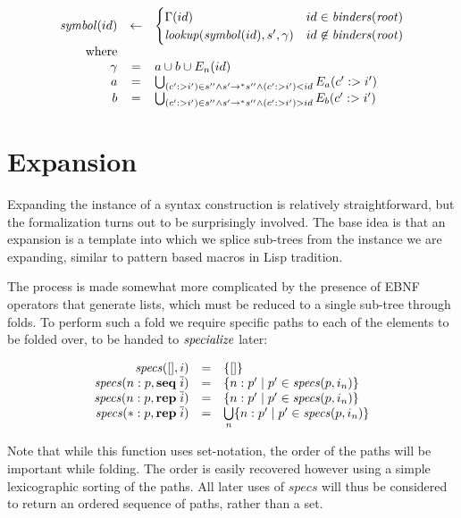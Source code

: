 \documentclass{kththesis}
\begin{document}
$$
\begin{array}{rcl}
\mathit{symbol}(id) & <- &
\begin{cases}
\Gamma(id) & id \in \mathit{binders}(\mathit{root}) \\
\mathit{lookup}(\mathit{symbol}(id), s', \gamma) & id \not\in \mathit{binders}(\mathit{root}) \\
\end{cases} \\
\text{where} & & \\
\gamma & = & a \cup b \cup E_n(id) \\
a & = & \bigcup_{(c' :> i') \in s'' \land s' ->* s'' \land (c' :> i') < id} E_a(c' :> i') \\
b & = & \bigcup_{(c' :> i') \in s'' \land s' ->* s'' \land (c' :> i') > id} E_b(c' :> i') \\
\end{array}
$$

\section{Expansion} \label{sec:expansion-formalization}

Expanding the instance of a syntax construction is relatively straightforward, but the formalization turns out to be surprisingly involved. The base idea is that an expansion is a template into which we splice sub-trees from the instance we are expanding, similar to pattern based macros in Lisp tradition.

The process is made somewhat more complicated by the presence of EBNF operators that generate lists, which must be reduced to a single sub-tree through folds. To perform such a fold we require specific paths to each of the elements to be folded over, to be handed to $\mathit{specialize}$ later:

\newcommand{\specs}{\ensuremath{\mathit{specs}}}

$$
\begin{array}{rcl}
\specs([], i) & = & \{[]\} \\
\specs(n:p, \seq \overline{i}) & = & \{n : p' \mid p' \in \specs(p, i_n)\} \\
\specs(n:p, \repseq \overline{i}) & = & \{n : p' \mid p' \in \specs(p, i_n)\} \\
\specs(*:p, \repseq \overline{i}) & = & \bigcup\limits_{n} \{n:p' \mid p' \in \specs(p, i_n)\} \\
\end{array}
$$

Note that while this function uses set-notation, the order of the paths will be important while folding. The order is easily recovered however using a simple lexicographic sorting of the paths. All later uses of $\specs$ will thus be considered to return an ordered sequence of paths, rather than a set.
\end{document}
